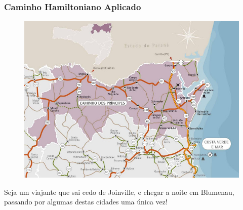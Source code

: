 \begin{frame}[fragile]
\frametitle{Caminho Hamiltoniano Aplicado}

\begin{figure}[!htb]
\centering
\includegraphics[width=.8\textwidth, height=0.567\textheight]{figures/mapa-norte-santa-catarina.jpg}
\end{figure}

Seja um viajante que sai cedo de Joinville, e chegar a noite
em Blumenau, passando por algumas destas cidades uma única vez!

\end{frame}



